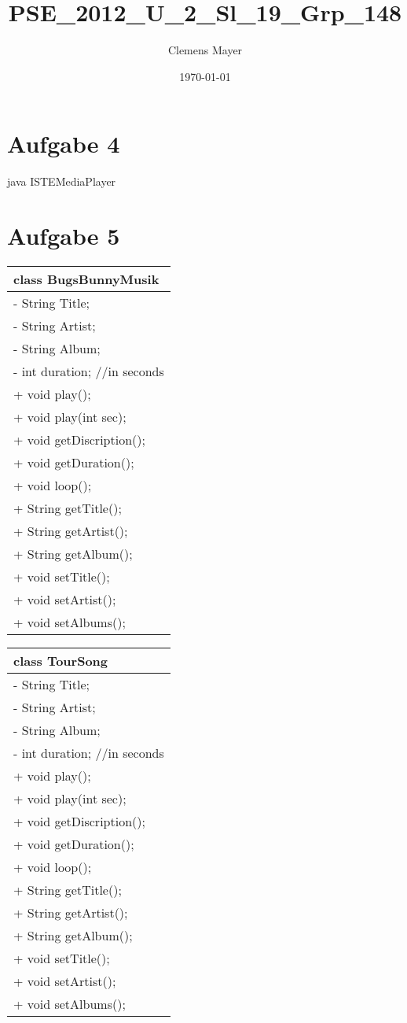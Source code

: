 \documentclass{scrartcl}
\title{PSE_2012_U_2_Sl_19_Grp_148}
\author{Clemens Mayer}
\date{\today}
\begin{document}
%

\section*{Aufgabe 4}
\bash[script,stdout,stderrFile=/Users/clemens/Documents/uni/PSE/gruppe_148/Hausaufgaben-Blatt-2/tex/PSE_2012_U_2_Sl_19_Grp_148.stderr,scriptFile=/Users/clemens/Documents/uni/PSE/gruppe_148/Hausaufgaben-Blatt-2/tex/script.sh,stdoutFile=/Users/clemens/Documents/uni/PSE/gruppe_148/Hausaufgaben-Blatt-2/tex/PSE_2012_U_2_Sl_19_Grp_148.stdout,exitCodeFile=/Users/clemens/Documents/uni/PSE/gruppe_148/Hausaufgaben-Blatt-2/tex/PSE_2012_U_2_Sl_19_Grp_148.exitCodes]
java ISTEMediaPlayer
\END
\section*{Aufgabe 5}
\begin{tabular}{|p{}|}
\hline
	class BugsBunnyMusik\\
\hline
	- String Title;\\
	- String Artist;\\
	- String Album;\\
	- int duration; //in seconds\\
\hline
	+ void play();\\
	+ void play(int sec);\\
	+ void getDiscription();\\
	+ void getDuration();\\
	+ void loop();\\
	+ String getTitle();\\
	+ String getArtist();\\
	+ String getAlbum();\\
	+ void setTitle();\\
	+ void setArtist();\\
	+ void setAlbums();\\
\hline
\end{tabular}
\begin{tabular}{|p{}|}
\hline
	class TourSong\\
\hline
	- String Title;\\
	- String Artist;\\
	- String Album;\\
	- int duration; //in seconds\\
\hline
	+ void play();\\
	+ void play(int sec);\\
	+ void getDiscription();\\
	+ void getDuration();\\
	+ void loop();\\
	+ String getTitle();\\
	+ String getArtist();\\
	+ String getAlbum();\\
	+ void setTitle();\\
	+ void setArtist();\\
	+ void setAlbums();\\
\hline
\end{tabular}
\end{document}
